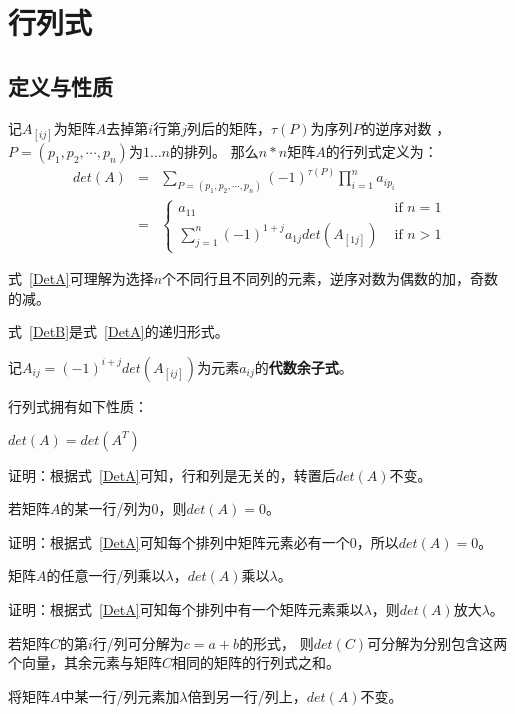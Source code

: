 \section{行列式}
\subsection{定义与性质}
记$A_{[ij]}$为矩阵$A$去掉第$i$行第$j$列后的矩阵，$\tau(P)$为序列$P$的逆序对数
，$P=(p_1,p_2,\cdots,p_n)$为$1\ldots n$的排列。
那么$n*n$矩阵$A$的行列式定义为：
\begin{eqnarray}
	det(A)&=&\sum_{P=(p_1,p_2,\cdots,p_n)}
	{(-1)^{\tau(P)}\prod_{i=1}^n{a_{ip_i}}}\label{DetA}\\
	&=&\left\{
	\begin{array}{ll}
		a_{11}                                                    & \textrm{~if~$n=1$} \\
		\displaystyle \sum_{j=1}^n{(-1)^{1+j}a_{1j}det(A_{[1j]})} & \textrm{~if~$n>1$}
	\end{array}
	\right.\label{DetB}
\end{eqnarray}

式~\ref{DetA}可理解为选择$n$个不同行且不同列的元素，逆序对数为偶数的加，奇数的减。

式~\ref{DetB}是式~\ref{DetA}的递归形式。

记$A_{ij}=(-1)^{i+j}det(A_{[ij]})$为元素$a_{ij}$的{\bfseries 代数余子式}。

行列式拥有如下性质：
\begin{property}
	$det(A)=det(A^T)$
\end{property}

证明：根据式~\ref{DetA}可知，行和列是无关的，转置后$det(A)$不变。
\begin{property}
	若矩阵$A$的某一行/列为0，则$det(A)=0$。
\end{property}

证明：根据式~\ref{DetA}可知每个排列中矩阵元素必有一个0，所以$det(A)=0$。
\begin{property}
	矩阵$A$的任意一行/列乘以$\lambda$，$det(A)$乘以$\lambda$。
\end{property}

证明：根据式~\ref{DetA}可知每个排列中有一个矩阵元素乘以$\lambda$，则$det(A)$放大$\lambda$。
\begin{property}
    若矩阵$C$的第$i$行/列可分解为$c=a+b$的形式，
    则$det(C)$可分解为分别包含这两个向量，其余元素与矩阵$C$相同的矩阵的行列式之和。
\end{property}
\begin{inference}
	将矩阵$A$中某一行/列元素加$\lambda$倍到另一行/列上，$det(A)$不变。
\end{inference}

